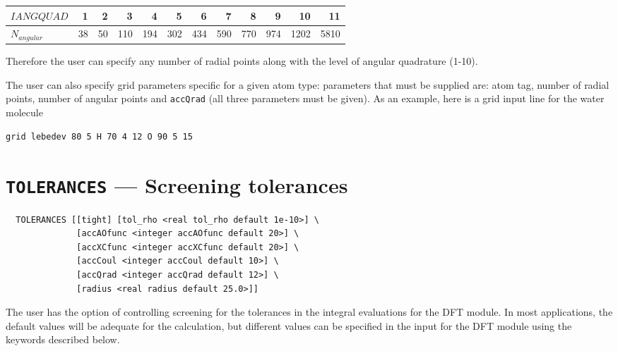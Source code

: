 \begin{center}
\begin{tabular}[right]{|l|r r r r r r r r r r r|} \hline
$IANGQUAD$ & 1 & 2 & 3 & 4 & 5 & 6 & 7 & 8 & 9 & 10 &11\\ \hline
$N_{angular}$ & 38 & 50 & 110 & 194 & 302 & 434 & 590 & 770 & 974 &
1202& 5810\\ \hline
\end{tabular}
\end{center}

Therefore the user can specify any number of radial points along with
the level of angular quadrature (1-10).

The user can also specify grid parameters specific for a given atom type: 
parameters that must be supplied are: atom tag, number of radial points, number
of angular points and \verb+accQrad+ (all three parameters must be given).
As an example, here is a grid input line for the water molecule
\begin{verbatim}
grid lebedev 80 5 H 70 4 12 O 90 5 15 
\end{verbatim}

%



\section{{\tt TOLERANCES} --- Screening tolerances}

\begin{verbatim}
  TOLERANCES [[tight] [tol_rho <real tol_rho default 1e-10>] \
              [accAOfunc <integer accAOfunc default 20>] \
              [accXCfunc <integer accXCfunc default 20>] \
              [accCoul <integer accCoul default 10>] \
              [accQrad <integer accQrad default 12>] \
              [radius <real radius default 25.0>]]
\end{verbatim}
%
%
The user has the option of controlling screening for the tolerances in
the integral evaluations for the DFT module.  In most applications,
the default values will be adequate for the calculation, but different
values can be specified in the input for the DFT module using the
keywords described below.

